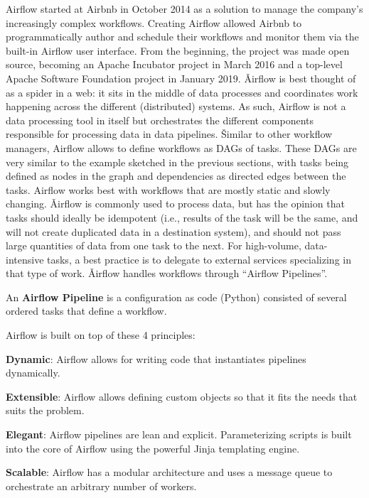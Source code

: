 Airflow started at Airbnb in October 2014 as a solution to manage the company's increasingly complex workflows.
Creating Airflow allowed Airbnb to programmatically author and schedule their workflows and monitor them via the
built-in Airflow user interface. From the beginning, the project was made open source, becoming an Apache Incubator
project in March 2016 and a top-level Apache Software Foundation project in January 2019. \v

Airflow is best thought of as a spider in a web: it sits in the middle of data processes and coordinates work happening
across the different (distributed) systems. As such, Airflow is not a data processing tool in itself but orchestrates
the different components responsible for processing data in data pipelines. \v

Similar to other workflow managers, Airflow allows to define workflows as DAGs of tasks. These DAGs are very similar
to the example sketched in the previous sections, with tasks being defined as nodes in the graph and dependencies as
directed edges between the tasks. Airflow works best with workflows that are mostly static and slowly changing. \v

Airflow is commonly used to process data, but has the opinion that tasks should ideally be idempotent (i.e., results
of the task will be the same, and will not create duplicated data in a destination system), and should not pass
large quantities of data from one task to the next. For high-volume, data-intensive tasks, a best practice is to
delegate to external services specializing in that type of work. \v

Airflow handles workflows through ``Airflow Pipelines''.

An \textbf{Airflow Pipeline} is a configuration as code (Python) consisted of several ordered tasks that define a
workflow.
\ed

Airflow is built on top of these 4 principles:
\bit
\item \textbf{Dynamic}: Airflow allows for writing code that instantiates pipelines dynamically.
\item \textbf{Extensible}: Airflow allows defining custom objects so that it fits the needs that suits the problem.
\item \textbf{Elegant}: Airflow pipelines are lean and explicit. Parameterizing scripts is built into the core of
Airflow using the powerful Jinja templating engine.
\item \textbf{Scalable}: Airflow has a modular architecture and uses a message queue to orchestrate an arbitrary number
of workers.
\eit

